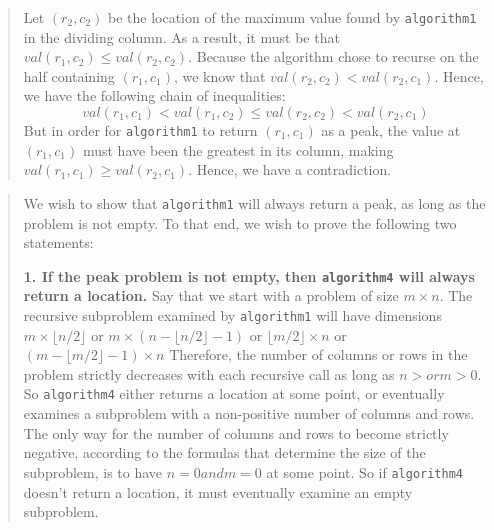 \documentclass[12pt,twoside]{article}
\begin{document}
\begin{problems}
\begin{quote}
Let $(r_2, c_2)$ be
the location of the maximum value found by \texttt{algorithm1}
in the dividing column.
As a result, it must be that $val(r_1, c_2) \le val(r_2, c_2)$.
Because the algorithm chose to recurse
on the half containing $(r_1, c_1)$,
we know that $val(r_2, c_2) < val(r_2, c_1)$.
Hence, we have the following chain of inequalities:
$$val(r_1, c_1) < val(r_1, c_2) \le val(r_2, c_2) < val(r_2, c_1)$$
But in order for \texttt{algorithm1} to return $(r_1, c_1)$ as a peak,
the value at $(r_1, c_1)$ must have been the greatest in its column,
making $val(r_1, c_1) \ge val(r_2, c_1)$.
Hence, we have a contradiction.
\end{quote}

\ifsolution \solution{}
\begin{quote}
We wish to show that \texttt{algorithm1}
will always return a peak,
as long as the problem is not empty.
To that end,
we wish to prove the following two statements:

{\bf 1. If the peak problem is not empty,
then \texttt{algorithm4} will always return a location.}
Say that we start with a problem of size $m \times n$.
The recursive subproblem examined by \texttt{algorithm1}
will have dimensions
$m \times \lfloor n / 2 \rfloor$ or 
$m \times \left(n - \lfloor n / 2 \rfloor - 1 \right)$ or
$\lfloor m / 2 \rfloor \times n$ or 
$\left(m - \lfloor m / 2 \rfloor - 1\right) \times n$
Therefore, the number of columns or rows in the problem
strictly decreases with each recursive call
as long as $n >  or m > 0$.
So \texttt{algorithm4} either returns a location at some point,
or eventually examines a subproblem with a non-positive
number of columns and rows.
The only way for the number of columns and rows to become strictly negative,
according to the formulas that determine the size of the subproblem,
is to have $n = 0 and m = 0$ at some point.
So if \texttt{algorithm4} doesn't return a location,
it must eventually examine an empty subproblem.


\end{quote}
\end{problems}
\end{document}
